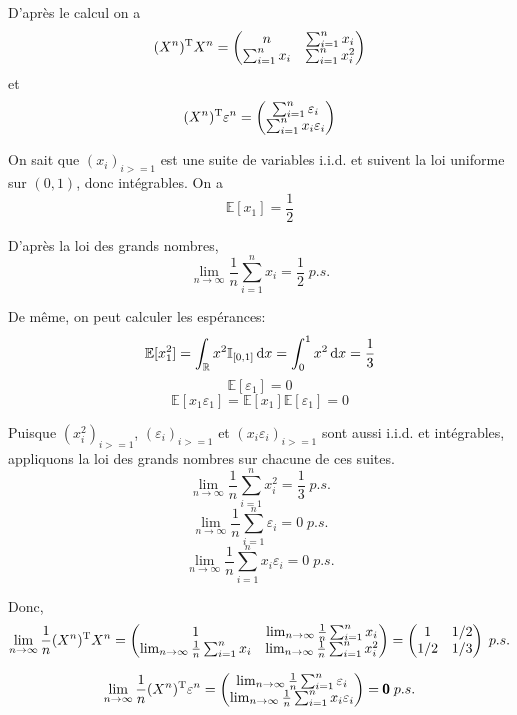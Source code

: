 \documentclass[a4paper,12pt]{article}
\begin{document}
D'après le calcul on a
$$(X^n)^{\text T}X^n = 
\begin{pmatrix}
	n & \sum_{i=1}^{n} x_i \\
	\sum_{i=1}^{n} x_i & \sum_{i=1}^{n} x_{i}^2
\end{pmatrix}
$$
et
$$(X^n)^{\text T}\varepsilon^n =
\begin{pmatrix}
	\sum_{i=1}^{n} \varepsilon_i \\
	\sum_{i=1}^{n} x_i \varepsilon_{i}
\end{pmatrix}
$$

On sait que ${\left(x_i\right)}_{i>=1}$ est une suite de variables i.i.d. et suivent la loi uniforme sur $\left(0, 1\right)$, donc intégrables. On a
$$\mathbb E[x_1] = \frac{1}{2}$$

D'après la loi des grands nombres,
$$\lim_{n \rightarrow \infty}{\frac{1}{n} \sum_{i=1}^{n} x_i} = \frac{1}{2} \; p.s.$$

De même, on peut calculer les espérances:
$$\mathbb E[x_1^2] = \int_{\mathbb{R}} {x^2} \mathbb{I}_{[0,1]} \,{\rm d}x = \int_0^1 {x^2} \,{\rm d}x = \frac{1}{3}$$
$$\mathbb E[\varepsilon_1] = 0$$
$$\mathbb E[x_1 \varepsilon_1] = \mathbb E[x_1] \mathbb E[\varepsilon_1] = 0$$

Puisque ${\left(x_{i}^2\right)}_{i>=1}$, ${\left(\varepsilon_i\right)}_{i>=1}$ et ${\left(x_i \varepsilon_{i}\right)}_{i>=1}$ sont aussi i.i.d. et intégrables, appliquons la loi des grands nombres sur chacune de ces suites.
$$\lim_{n \rightarrow \infty}{\frac{1}{n} \sum_{i=1}^{n} x_{i}^2} = \frac{1}{3} \; p.s.$$
$$\lim_{n \rightarrow \infty}{\frac{1}{n} \sum_{i=1}^{n} \varepsilon_i} = 0 \; p.s.$$
$$\lim_{n \rightarrow \infty}{\frac{1}{n} \sum_{i=1}^{n} x_i \varepsilon_{i}} = 0 \; p.s.$$

Donc,
$$ \lim_{n \rightarrow \infty} {\frac{1}{n}(X^n)^{\text T}X^n} =
\begin{pmatrix}
	1 & \lim_{n \rightarrow \infty}{\frac{1}{n} \sum_{i=1}^{n} x_i} \\
	\lim_{n \rightarrow \infty}{\frac{1}{n} \sum_{i=1}^{n} x_i} & \lim_{n \rightarrow \infty}{\frac{1}{n} \sum_{i=1}^{n} x_{i}^2}
\end{pmatrix}
=
\begin{pmatrix}
	1 & 1 / 2 \\
	1 / 2 & 1 / 3
\end{pmatrix} \; p.s. $$

$$ \lim_{n \rightarrow \infty} {\frac{1}{n}(X^n)^{\text T}\varepsilon^n} =
\begin{pmatrix}
	\lim_{n \rightarrow \infty}{\frac{1}{n} \sum_{i=1}^{n} \varepsilon_i} \\
	\lim_{n \rightarrow \infty}{\frac{1}{n} \sum_{i=1}^{n} x_i \varepsilon_{i}}
\end{pmatrix}
= \pmb{0} \; p.s. $$
\end{document}
